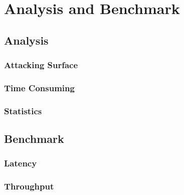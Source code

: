 \chapter{Analysis and Benchmark}

\section{Analysis}
\subsection{Attacking Surface}
\subsection{Time Consuming}
\subsection{Statistics}

\section{Benchmark}
\subsection{Latency}
\subsection{Throughput}